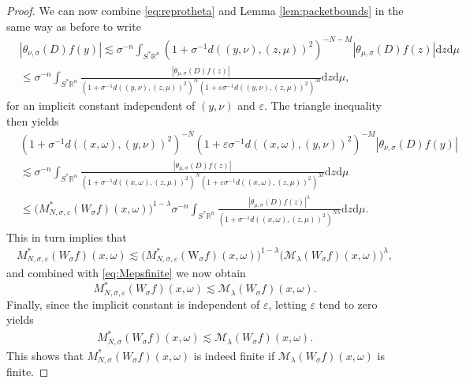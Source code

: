 \documentclass{amsart}
\newcommand {\ud}{\mathrm{d}}
\newcommand {\veps}{\varepsilon}
\newcommand {\Ma}{\mathcal{M}}
\newcommand {\Rn}{\mathbb{R}^{n}}
\newcommand {\Sp}{S^{*}\Rn}
\newcommand {\w}{\omega}
\newcommand {\W}{\mathrm{W}}
\theoremstyle{definition}
\numberwithin{equation}{section}
\begin{document}
\begin{proof}
We can now combine \eqref{eq:reprotheta} and Lemma \ref{lem:packetbounds} in the same way as before to write
\begin{align*}
&|\theta_{\nu,\sigma}(D)f(y)|\lesssim\sigma^{-n}
\int_{\Sp}(1+\sigma^{-1}d((y,\nu),(z,\mu))^{2})^{-N-M}|\theta_{\mu,{\sigma}}(D)f(z)|\ud z\ud\mu\\
&\leq \sigma^{-n}
\int_{\Sp}\frac{|\theta_{\mu,\sigma}(D)f(z)|}{(1+\sigma^{-1}d((y,\nu),(z,\mu))^{2})^{N}(1+\veps\sigma^{-1}d((y,\nu),(z,\mu))^{2})^{M}}\ud z\ud\mu,
\end{align*}
for an implicit constant independent of $(y,\nu)$ and $\veps$. The triangle inequality then yields
\begin{align*}
&(1+\sigma^{-1}d((x,\omega),(y,\nu))^{2})^{-N}(1+\veps\sigma^{-1}d((x,\omega),(y,\nu))^{2})^{-M}|\theta_{\nu,\sigma}(D)f(y)|\\
&\lesssim\sigma^{-n}\int_{\Sp}\frac{|\theta_{\mu,\sigma}(D)f(z)|}{(1+\sigma^{-1}d((x,\w),(z,\mu))^{2})^{N}(1+\veps\sigma^{-1}d((x,\w),(z,\mu))^{2})^{M}}\ud z\ud\mu\\
&\leq \big(M_{N,\sigma,\veps}^{*}(W_{\sigma}f)(x,\omega)\big)^{1-\lambda}
\sigma^{-n}\int_{\Sp}\frac{|\theta_{\mu,{\sigma}}(D)f(z)|^{\lambda}}{(1+\sigma^{-1}d((x,\omega),(z,\mu))^{2})^{N\lambda}}
 \ud z\ud\mu.
\end{align*}
This in turn implies that
\begin{align*}
M_{N,\sigma,\veps}^{*}(W_{\sigma}f)(x,\omega)\lesssim \big(M_{N,\sigma,\veps}^{*}(\W_{\sigma}f)(x,\omega)\big)^{1-\lambda}\big(\Ma_{\lambda}(W_{\sigma}f)(x,\omega)\big)^{\lambda},
\end{align*}
and combined with \eqref{eq:Mepsfinite} we now obtain
\[
M_{N,\sigma,\veps}^{*}(W_{\sigma}f)(x,\omega)\lesssim\Ma_{\lambda}(W_{\sigma}f)(x,\omega).
\]
Finally, since the implicit constant is independent of $\veps$, letting $\varepsilon$ tend to zero yields
\begin{align*}
M_{N,\sigma}^{*}(W_{\sigma}f)(x,\omega)\lesssim\Ma_{\lambda}(W_{\sigma}f)(x,\omega).
\end{align*}
This shows that $M_{N,\sigma}^{*}(W_{\sigma}f)(x,\omega)$ is indeed finite if $\Ma_{\lambda}(W_{\sigma}f)(x,\omega)$ is finite. %
\end{proof}

\end{document}
